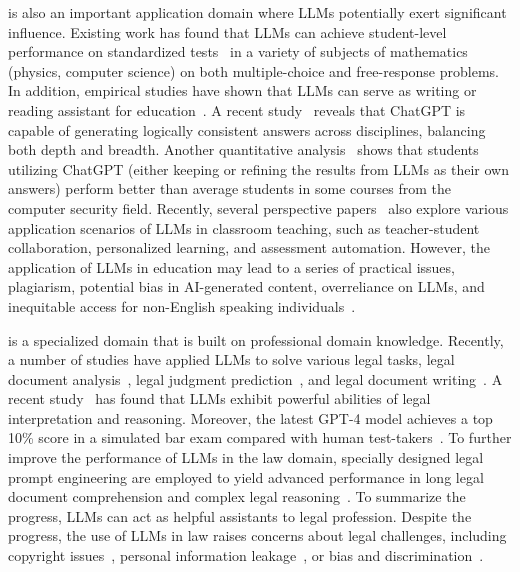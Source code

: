 {{{
is also an important application domain where LLMs potentially exert significant influence.  %
Existing work has found that LLMs can achieve student-level performance on standardized tests~\cite{OpenAI-OpenAI-2023-GPT-4} in a variety of  subjects of mathematics (\eg physics, computer science) on both multiple-choice and free-response problems.
In addition, empirical studies have shown that LLMs can  serve as writing or reading assistant  for education~\cite{Malinka-arxiv-2023-Education,Susnjak-arxiv-2022-Education}.
A recent study~\cite{Susnjak-arxiv-2022-Education} reveals that 
ChatGPT is capable of generating logically consistent answers across disciplines, balancing both depth and breadth.
Another quantitative analysis~\cite{Malinka-arxiv-2023-Education} shows that {students utilizing ChatGPT (either keeping or refining the results from LLMs as their own answers) perform better than average students in some courses from the computer security field. 
{Recently, several perspective papers~\cite{Tan-arxiv-2023-towards,Kamalov-2023-arxiv-A} also explore various application scenarios of LLMs in classroom teaching, such as teacher-student collaboration, personalized learning, and assessment automation.}
{However, the application of LLMs in education may lead to a series of practical issues, \eg  plagiarism, potential bias in AI-generated content, overreliance  on LLMs, and inequitable access for non-English speaking individuals~\cite{Kasneci-learning-2023-chatgpt}.}
}


is a specialized domain that is built on professional domain knowledge. 
{Recently, a number of studies have applied LLMs} to solve various legal tasks, \eg legal document analysis~\cite{Stanek-arxiv-2023-Can}, legal judgment prediction~\cite{Trautmann-arxiv-2022-Legal}, and legal document writing~\cite{Choi-SSRN-2023-Chatgpt}. A recent study~\cite{Nay-arxiv-2022-Law} has found that 
{LLMs exhibit powerful abilities of legal interpretation and reasoning.} 
Moreover, the latest GPT-4 model achieves a top 10\% score in a simulated bar exam compared with human test-takers~\cite{OpenAI-OpenAI-2023-GPT-4}. 
{
To further improve the performance of LLMs in the law domain,  specially designed legal prompt engineering are employed to  yield advanced performance in long legal document comprehension and complex legal reasoning~\cite{Yu-2022-arxiv-Legal,Trautmann-2022-arxiv-Legal}.
To summarize the progress, LLMs can act as helpful assistants to legal profession.  
Despite the progress, the use of LLMs in law raises concerns about legal challenges, including copyright issues~\cite{Tamkin-arxiv-2021-Understanding}, personal information leakage~\cite{Sun-arxiv-2023-A}, or bias and discrimination~\cite{Abid-AIES-2021-Persistent}.
}


}}}
